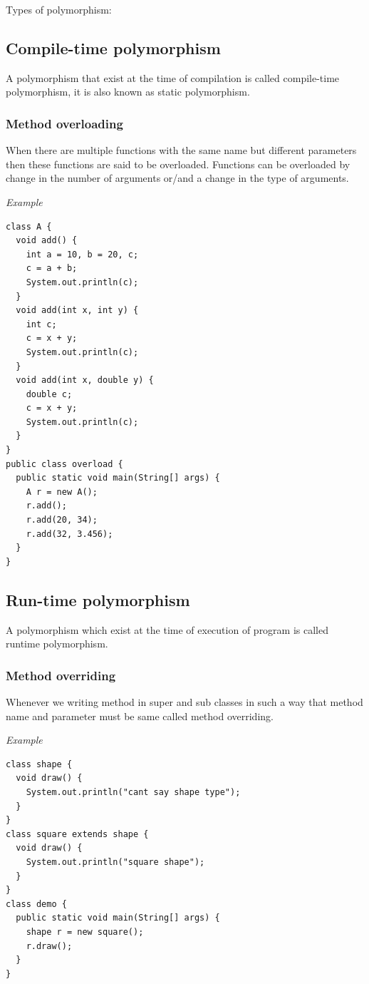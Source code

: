 \documentclass[twocolumn, a4paper]{article}
\begin{document}
Types of polymorphism:
\subsection{Compile-time polymorphism}
A polymorphism that exist at the time of compilation is called compile-time
polymorphism, it is also known as static polymorphism.
\subsubsection{Method overloading}
When there are multiple functions with the same name but different parameters
then these functions are said to be overloaded. Functions can be overloaded by
change in the number of arguments or/and a change in the type of arguments.

\noindent\emph{Example}
\begin{lstlisting}
class A {
  void add() {
    int a = 10, b = 20, c;
    c = a + b;
    System.out.println(c);
  }
  void add(int x, int y) {
    int c;
    c = x + y;
    System.out.println(c);
  }
  void add(int x, double y) {
    double c;
    c = x + y;
    System.out.println(c);
  }
}
public class overload {
  public static void main(String[] args) {
    A r = new A();
    r.add();
    r.add(20, 34);
    r.add(32, 3.456);
  }
}
\end{lstlisting}

\subsection{Run-time polymorphism}
A polymorphism which exist at the time of execution of program is called
runtime polymorphism.

\subsubsection{Method overriding}
Whenever we writing method in super and sub classes in such a way that method
name and parameter must be same called method overriding.

\noindent\emph{Example}
\begin{lstlisting}
class shape {
  void draw() {
    System.out.println("cant say shape type");
  }
}
class square extends shape {
  void draw() {
    System.out.println("square shape");
  }
}
class demo {
  public static void main(String[] args) {
    shape r = new square();
    r.draw();
  }
}
\end{lstlisting}
\end{document}
